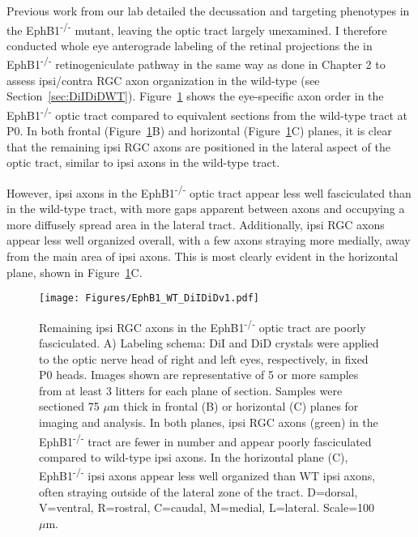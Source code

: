 \label{sec:DiIDiDEphB1}
Previous work from our lab detailed the decussation and targeting phenotypes in the EphB1\textsuperscript{-/-} mutant, leaving the optic tract largely unexamined.
I therefore conducted whole eye anterograde labeling of the retinal projections the in EphB1\textsuperscript{-/-} retinogeniculate pathway in the same way as done in Chapter 2 to assess ipsi/contra RGC axon organization in the wild-type (see Section~\ref{sec:DiIDiDWT}).
Figure~\ref{EphB1WTDiIDiD} shows the eye-specific axon order in the EphB1\textsuperscript{-/-} optic tract compared to equivalent sections from the wild-type tract at P0.
In both frontal (Figure~\ref{EphB1WTDiIDiD}B) and horizontal (Figure~\ref{EphB1WTDiIDiD}C) planes, it is clear that the remaining ipsi RGC axons are positioned in the lateral aspect of the optic tract, similar to ipsi axons in the wild-type tract.

However, ipsi axons in the EphB1\textsuperscript{-/-} optic tract appear less well fasciculated than in the wild-type tract, with more gaps apparent between axons and occupying a more diffusely spread area in the lateral tract.
Additionally, ipsi RGC axons appear less well organized overall, with a few axons straying more medially, away from the main area of ipsi axons.
This is most clearly evident in the horizontal plane, shown in Figure~\ref{EphB1WTDiIDiD}C.
\begin{figure}[hbtp]
    \begin{center}
        \texttt{[image: Figures/EphB1\_WT\_DiIDiDv1.pdf]}
        \caption[Remaining ipsi RGC axons in the EphB1\textsuperscript{-/-} optic tract are poorly fasciculated.]
        {Remaining ipsi RGC axons in the EphB1\textsuperscript{-/-} optic tract are poorly fasciculated.
        A) Labeling schema: DiI and DiD crystals were applied to the optic nerve head of right and left eyes, respectively, in fixed P0 heads.
		Images shown are representative of 5 or more samples from at least 3 litters for each plane of section.
        Samples were sectioned 75 $\mu$m thick in frontal (B) or horizontal (C) planes for imaging and analysis.
        In both planes, ipsi RGC axons (green) in the EphB1\textsuperscript{-/-} tract are fewer in number and appear poorly fasciculated compared to wild-type ipsi axons.
        In the horizontal plane (C), EphB1\textsuperscript{-/-} ipsi axons appear less well organized than WT ipsi axons, often straying outside of the lateral zone of the tract.
        D=dorsal, V=ventral, R=rostral, C=caudal, M=medial, L=lateral.
        Scale=100 $\mu$m.
        }
        \label{EphB1WTDiIDiD}
    \end{center}
\end{figure}

